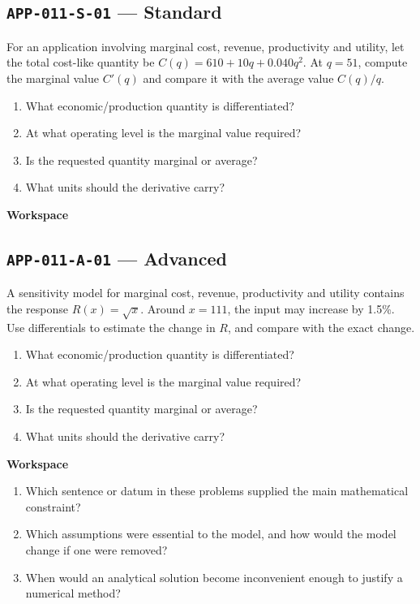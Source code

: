 \documentclass[11pt]{book}
\newcommand{\pid}[1]{\texttt{#1}}
\newcommand{\workspace}{\par\vspace{0.7in}\hrulefill\par\vspace{0.55in}\hrulefill\par}
\begin{document}
\subsection*{\pid{APP-011-S-01} — Standard}
\begin{problembox}
For an application involving marginal cost, revenue, productivity and utility, let the total cost-like quantity be $C(q)=610+10q+0.040q^2$. At $q=51$, compute the marginal value $C'(q)$ and compare it with the average value $C(q)/q$.
\end{problembox}
\begin{promptbox}\begin{enumerate}
\item What economic/production quantity is differentiated?
\item At what operating level is the marginal value required?
\item Is the requested quantity marginal or average?
\item What units should the derivative carry?
\end{enumerate}\end{promptbox}
\textbf{Workspace}\workspace
{}
\subsection*{\pid{APP-011-A-01} — Advanced}
\begin{problembox}
A sensitivity model for marginal cost, revenue, productivity and utility contains the response $R(x)=\sqrt{x}$. Around $x=111$, the input may increase by 1.5\%. Use differentials to estimate the change in $R$, and compare with the exact change.
\end{problembox}
\begin{promptbox}\begin{enumerate}
\item What economic/production quantity is differentiated?
\item At what operating level is the marginal value required?
\item Is the requested quantity marginal or average?
\item What units should the derivative carry?
\end{enumerate}\end{promptbox}
\textbf{Workspace}\workspace
\begin{reflectionbox}\begin{enumerate}
\item Which sentence or datum in these problems supplied the main mathematical constraint?
\item Which assumptions were essential to the model, and how would the model change if one were removed?
\item When would an analytical solution become inconvenient enough to justify a numerical method?
\end{enumerate}\end{reflectionbox}
\end{document}
